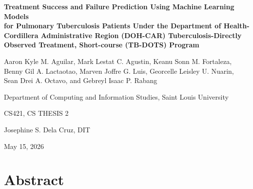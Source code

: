 \documentclass[12pt]{article}
\begin{document}
\begin{center}
\vspace*{3\baselineskip}

{\bfseries Treatment Success and Failure Prediction Using Machine Learning Models\\
for Pulmonary Tuberculosis Patients Under the Department of Health-Cordillera Administrative Region (DOH-CAR) Tuberculosis-Directly Observed Treatment, Short-course (TB-DOTS) Program}

\vspace{2\baselineskip}

Aaron Kyle M. Aguilar, Mark Lestat C. Agustin, Keanu Sonn M. Fortaleza,\\
Benny Gil A. Lactaotao, Marven Joffre G. Luis, Georcelle Leisley U. Nuarin,\\
Sean Drei A. Octavo, and Gebreyl Isaac P. Rabang

\vspace{0.5\baselineskip}

Department of Computing and Information Studies, Saint Louis University

\vspace{0.5\baselineskip}
CS421, CS THESIS 2

\vspace{0.5\baselineskip}
Josephine S. Dela Cruz, DIT

\vspace{0.5\baselineskip}
May 15, 2026

\end{center}

\newpage

\section*{Abstract}
\end{document}
